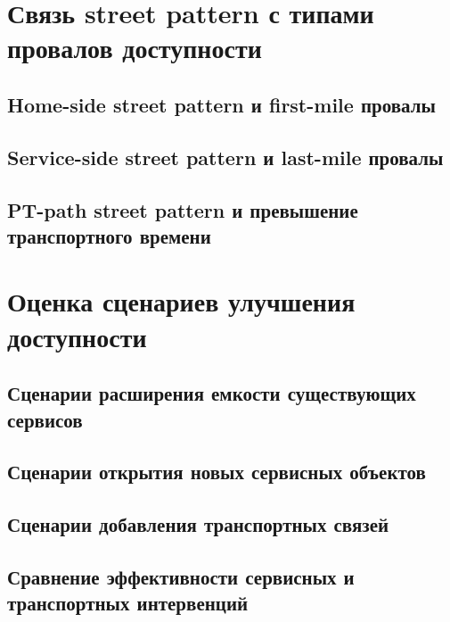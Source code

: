 \section{Связь street pattern с типами провалов доступности}
\label{sec:street-pattern-failure-results}

\subsection{Home-side street pattern и first-mile провалы}
\label{subsec:home-side-results}

\subsection{Service-side street pattern и last-mile провалы}
\label{subsec:service-side-results}

\subsection{PT-path street pattern и превышение транспортного времени}
\label{subsec:pt-path-results}

\section{Оценка сценариев улучшения доступности}
\label{sec:improvement-scenarios}

\subsection{Сценарии расширения емкости существующих сервисов}
\label{subsec:capacity-expansion-results}

\subsection{Сценарии открытия новых сервисных объектов}
\label{subsec:new-sites-results}

\subsection{Сценарии добавления транспортных связей}
\label{subsec:transport-links-results}

\subsection{Сравнение эффективности сервисных и транспортных интервенций}
\label{subsec:intervention-comparison-results}

